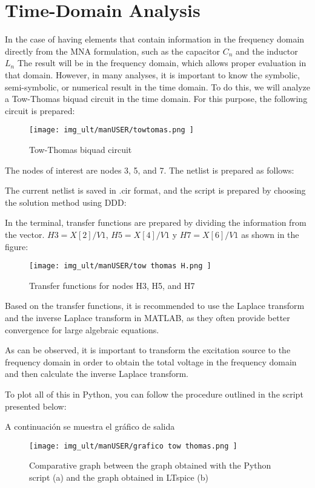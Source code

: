 \section{Time-Domain Analysis}
	In the case of having elements that contain information in the frequency domain directly from the MNA formulation, such as the capacitor
 $C_{n}$ and the inductor $L_{n}$ The result will be in the frequency domain, which allows proper evaluation in that domain. However, in many analyses, it is important to know the symbolic, semi-symbolic, or numerical result in the time domain. To do this, we will analyze a Tow-Thomas biquad circuit in the time domain. For this purpose, the following circuit is prepared:

\begin{figure}[H]
	\centering\texttt{[image: img\_ult/manUSER/towtomas.png
	]}
	\caption{Tow-Thomas biquad circuit}
	\label{img:Tow thomas}
\end{figure} 

The nodes of interest are nodes 3, 5, and 7. The netlist is prepared as follows:


The current netlist is saved in .cir format, and the script is prepared by choosing the solution method using DDD:



In the terminal, transfer functions are prepared by dividing the information from the vector. $H3=X[2]/V1$, $H5=X[4]/V1$ y $H7=X[6]/V1$ as shown in the figure:

\begin{figure}[H]
	\centering\texttt{[image: img\_ult/manUSER/tow thomas H.png
	]}
	\caption{Transfer functions for nodes H3, H5, and H7}
	\label{img:Tow thomas H}
\end{figure} 

Based on the transfer functions, it is recommended to use the Laplace transform and the inverse Laplace transform in MATLAB, as they often provide better convergence for large algebraic equations.



As can be observed, it is important to transform the excitation source to the frequency domain in order to obtain the total voltage in the frequency domain and then calculate the inverse Laplace transform.

To plot all of this in Python, you can follow the procedure outlined in the script presented below:



A continuación se muestra el gráfico de salida 

\begin{figure}[H]
	\centering\texttt{[image: img\_ult/manUSER/grafico tow thomas.png
	]}
	\caption{Comparative graph between the graph obtained with the Python script (a) and the graph obtained in LTspice (b)}
	\label{img:Tow thomas grafico}
\end{figure} 


